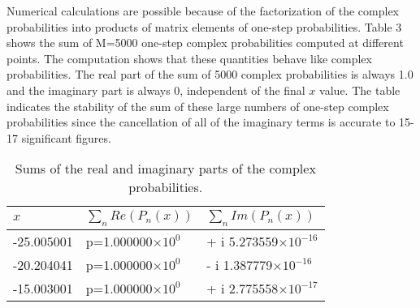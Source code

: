 \documentclass[aps,prc,reprint,noshowpacs,groupedaddress,onecolumn]{revtex4}
\begin{document}
Numerical calculations are possible because of the factorization of
the complex probabilities into products of matrix elements of one-step
probabilities.  Table 3 shows the sum of M=5000 one-step complex
probabilities computed at different points.  The computation shows
that these quantities behave like complex probabilities.  The real
part of the sum of 5000 complex probabilities is always 1.0 and the
imaginary part is always 0, independent of the final $x$ value.  The
table indicates the stability of the sum of these large numbers of
one-step complex probabilities since the cancellation of all of the
imaginary terms is accurate to 15-17 significant figures.
\begin{table}
\caption{Sums of the real and imaginary parts of the complex probabilities.} 
\begin{tabular}{lll}
\hline
\hline
$x$ & $\sum_n Re (P_n(x))$ &$\sum_n Im (P_n(x))$\\
\hline
-25.005001 & p=1.000000$\times 10^0$ & + i 5.273559$\times 10^{-16}$ \\
-20.204041 &p=1.000000$\times 10^0$ &- i 1.387779$\times 10^{-16}$ \\
-15.003001 & p=1.000000$\times 10^0$ & + i 2.775558$\times 10^{-17}$ \\

\end{tabular}
\end{table}
\end{document}
